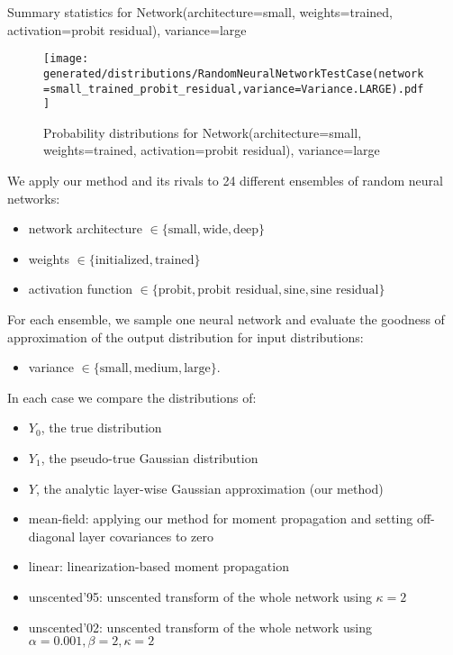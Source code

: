\documentclass{article}
\begin{document}
\begin{table}[H]\begin{center}
\end{center}
\caption{\label{table:random-neural-networks-small-trained-probit-residual}Summary statistics for Network(architecture=small, weights=trained, activation=probit residual), variance=large}
\end{table}\begin{figure}[H]\begin{center}
\texttt{[image: generated/distributions/RandomNeuralNetworkTestCase(network=small\_trained\_probit\_residual,variance=Variance.LARGE).pdf]}
\end{center}
\caption{\label{fig:random-neural-networks-small-trained-probit-residual}Probability distributions for Network(architecture=small, weights=trained, activation=probit residual), variance=large}
\end{figure}
We apply our method and its rivals to 24 different ensembles of random neural networks:
\begin{itemize}
  \item network architecture \( \in \{\text{small}, \text{wide}, \text{deep}\} \)
  \item weights \( \in \{\text{initialized}, \text{trained}\} \)
  \item activation function \( \in \{\text{probit}, \text{probit residual}, \text{sine}, \text{sine residual}\} \)
\end{itemize}
For each ensemble, we sample one neural network and evaluate the goodness of approximation of the output distribution for input distributions: 
\begin{itemize}
  \item variance \( \in \{\text{small}, \text{medium}, \text{large}\} \).
\end{itemize}
In each case we compare the distributions of:
\begin{itemize}
  \item \(Y_0\), the true distribution
  \item \(Y_1\), the pseudo-true Gaussian distribution
  \item \(Y\), the analytic layer-wise Gaussian approximation (our method)
  \item mean-field: applying our method for moment propagation and setting off-diagonal layer covariances to zero
  \item linear: linearization-based moment propagation
  \item unscented'95: unscented transform of the whole network using \(\kappa=2\)
  \item unscented'02: unscented transform of the whole network using \(\alpha=0.001, \beta=2, \kappa=2\)
\end{itemize}
\end{document}
